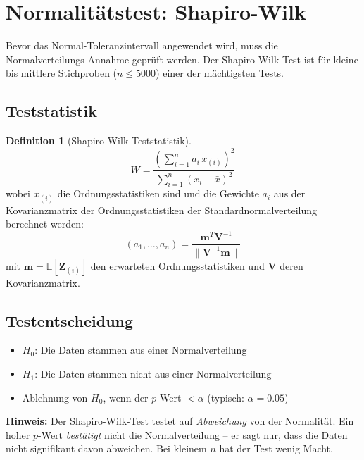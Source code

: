 \documentclass[10pt,a4paper,twocolumn]{article}
\theoremstyle{definition}
\newtheorem{definition}{Definition}[section]
\newcommand{\hinweis}[1]{%
    \begin{center}
    \colorbox{noteblue}{\parbox{0.92\linewidth}{\small\textbf{Hinweis:} #1}}
    \end{center}
}
\newcommand{\TI}{Toleranzintervall}
\newcommand{\E}{\mathbb{E}}
\newcommand{\xbar}{\bar{x}}
\begin{document}
\section{Normalitätstest: Shapiro-Wilk}
\label{sec:shapiro}

Bevor das Normal-\TI{} angewendet wird, muss die Normalverteilungs-Annahme
geprüft werden. Der Shapiro-Wilk-Test ist für kleine bis mittlere
Stichproben ($n \leq 5000$) einer der mächtigsten Tests.

\subsection{Teststatistik}

\begin{definition}[Shapiro-Wilk-Teststatistik]
\begin{equation}
    W = \frac{\left(\sum_{i=1}^{n} a_i\, x_{(i)}\right)^2}
             {\sum_{i=1}^{n} (x_i - \xbar)^2}
    \label{eq:shapiro}
\end{equation}
wobei $x_{(i)}$ die Ordnungsstatistiken sind und die Gewichte
$a_i$ aus der Kovarianzmatrix der Ordnungsstatistiken der
Standardnormalverteilung berechnet werden:
\begin{equation}
    (a_1, \ldots, a_n) = \frac{\mathbf{m}^T \mathbf{V}^{-1}}
    {\|\mathbf{V}^{-1}\mathbf{m}\|}
\end{equation}
mit $\mathbf{m} = \E[\mathbf{Z}_{(i)}]$ den erwarteten
Ordnungsstatistiken und $\mathbf{V}$ deren Kovarianzmatrix.
\end{definition}

\subsection{Testentscheidung}

\begin{itemize}[nosep,leftmargin=*]
    \item $H_0$: Die Daten stammen aus einer Normalverteilung
    \item $H_1$: Die Daten stammen nicht aus einer Normalverteilung
    \item Ablehnung von $H_0$, wenn der $p$-Wert $< \alpha$
          (typisch: $\alpha = 0.05$)
\end{itemize}

\hinweis{Der Shapiro-Wilk-Test testet auf \emph{Abweichung} von der
Normalität. Ein hoher $p$-Wert \emph{bestätigt} nicht die
Normalverteilung -- er sagt nur, dass die Daten nicht signifikant
davon abweichen. Bei kleinem $n$ hat der Test wenig Macht.}
\end{document}
